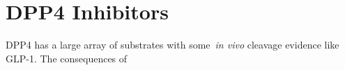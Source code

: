\section{DPP4 Inhibitors}
DPP4 has a large array of substrates with some~\textit{in vivo} cleavage evidence like GLP-1. The consequences of